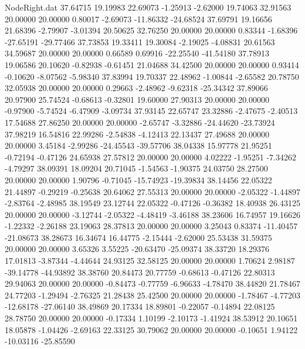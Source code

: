 \begin{filecontents}{NodeRight.dat}
  37.64715   19.19983   22.69073    -1.25913   -2.62000   19.74063   32.91563   20.00000   20.00000    0.80017   -2.69073  -11.86332  -24.68524
  37.69791   19.16656   21.68396    -2.79907   -3.01394   20.50625   32.76250   20.00000   20.00000    0.83344   -1.68396  -27.65191  -29.77466
  37.73853   19.33411   19.30084    -2.19025   -4.08831   20.61563   34.59687   20.00000   20.00000    0.66589    0.69916  -22.25540  -41.54180
  37.78913   19.06586   20.10620    -0.82938   -0.61451   21.04688   34.42500   20.00000   20.00000    0.93414   -0.10620   -8.07562   -5.98340
  37.83994   19.70337   22.48962    -1.00844   -2.65582   20.78750   32.05938   20.00000   20.00000    0.29663   -2.48962   -9.62318  -25.34342
  37.89066   20.97900   25.74524    -0.68613   -0.32801   19.60000   27.90313   20.00000   20.00000   -0.97900   -5.74524   -6.47909   -3.09734
  37.93145   22.65747   23.32886    -2.47675   -2.40513   17.54688   27.86250   20.00000   20.00000   -2.65747   -3.32886  -24.44620  -23.73924
  37.98219   16.54816   22.99286    -2.54838   -4.12413   22.13437   27.49688   20.00000   20.00000    3.45184   -2.99286  -24.45543  -39.57706
  38.04338   15.97778   21.95251    -0.72194   -0.47126   24.65938   27.57812   20.00000   20.00000    4.02222   -1.95251   -7.34262   -4.79297
  38.09391   18.09204   20.71045    -1.54563   -1.90375   24.03750   28.27500   20.00000   20.00000    1.90796   -0.71045  -15.74923  -19.39834
  38.14456   22.05322   21.44897    -0.29219   -0.25638   20.64062   27.55313   20.00000   20.00000   -2.05322   -1.44897   -2.83764   -2.48985
  38.19549   23.12744   22.05322    -0.47126   -0.36382   18.40938   26.43125   20.00000   20.00000   -3.12744   -2.05322   -4.48419   -3.46188
  38.23606   16.74957   19.16626    -1.22332   -2.26188   23.19063   28.37813   20.00000   20.00000    3.25043    0.83374  -11.40457  -21.08673
  38.28673   16.34674   16.44775    -2.15444   -2.62000   25.53438   31.59375   20.00000   20.00000    3.65326    3.55225  -20.63470  -25.09374
  38.33720   18.29376   17.01813    -3.87344   -4.44644   24.93125   32.58125   20.00000   20.00000    1.70624    2.98187  -39.14778  -44.93892
  38.38760   20.84473   20.77759    -0.68613   -0.47126   22.80313   29.94063   20.00000   20.00000   -0.84473   -0.77759   -6.96633   -4.78470
  38.44820   21.78467   24.77203    -1.29494   -2.76325   21.28438   25.42500   20.00000   20.00000   -1.78467   -4.77203  -12.68178  -27.06140
  38.49869   20.17334   18.89801    -0.22057   -0.14894   22.08125   28.78750   20.00000   20.00000   -0.17334    1.10199   -2.10173   -1.41924
  38.53912   20.10651   18.05878    -1.04426   -2.69163   22.33125   30.79062   20.00000   20.00000   -0.10651    1.94122  -10.03116  -25.85590

\end{filecontents}
